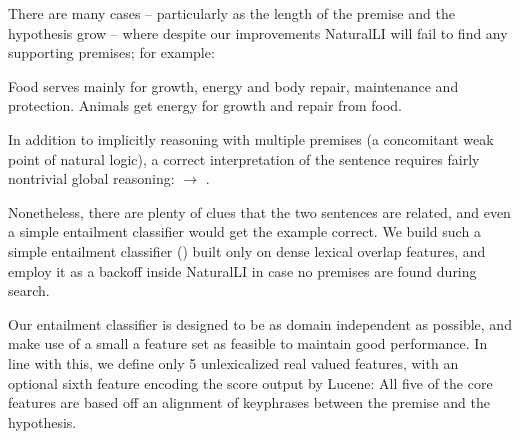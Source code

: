 There are many cases -- particularly as the length of the premise and the hypothesis grow --
  where despite our improvements NaturalLI will fail to find any supporting
  premises; for example:

\entailmentExample
{Food serves mainly for growth, energy and body repair, maintenance and protection.}
{Animals get energy for growth and repair from food.}

In addition to implicitly reasoning with multiple premises (a concomitant weak
  point of natural logic), a correct interpretation of the sentence requires
  fairly nontrivial global reasoning: 
  $\rightarrow$ .

Nonetheless, there are plenty of clues that the two sentences are related, and even a simple
  entailment classifier would get the example correct.
We build such a simple entailment classifier () built only
  on dense lexical overlap features, and employ it as a backoff inside NaturalLI
  in case no premises are found during search.



%
%
Our entailment classifier is designed to be as domain independent as possible,
  and make use of a small a feature set as feasible to maintain good performance.
In line with this, we define only 5 unlexicalized real valued features, with an 
  optional sixth feature encoding the score output by Lucene:
All five of the core features are based off an alignment of keyphrases between the
  premise and the hypothesis.

